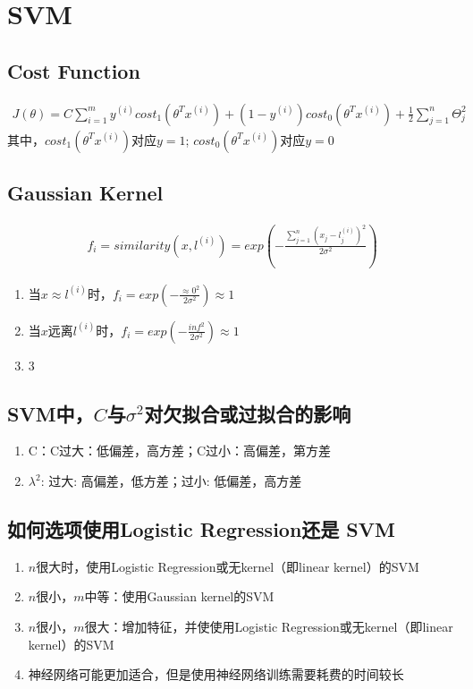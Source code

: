 \section{SVM}
\subsection{Cost Function}
\begin{equation}\begin{aligned}
	J(\theta) = C\sum_{i=1}^m y^{(i)}cost_1(\theta^Tx^{(i)}) + (1-y^{(i)})cost_0(\theta^Tx^{(i)}) + \frac{1}{2}\sum_{j=1}^n\Theta_j^2
\end{aligned}\end{equation}
其中，$cost_1(\theta^Tx^{(i)})$对应$y=1$; $cost_0(\theta^Tx^{(i)})$对应$y=0$


\subsection{Gaussian Kernel}
\begin{equation}\begin{aligned}
	f_i = similarity(x, l^{(i)}) = exp(-\frac{\sum_{j=1}^n(x_j - l_j^{(i)})^2}{2\sigma^2})
\end{aligned}\end{equation}
\begin{enumerate}
	\item 当$x \approx l^{(i)}$时，$f_i=exp(-\frac{\approx 0^2}{2\sigma^2}) \approx 1$
	\item 当$x$远离$l^{(i)}$时，$f_i=exp(-\frac{inf^2}{2\sigma^2}) \approx 1$
	\item 3
\end{enumerate}





\subsection{SVM中，$C$与$\sigma^2$对欠拟合或过拟合的影响}
\begin{enumerate}
	\item C：C过大：低偏差，高方差；C过小：高偏差，第方差
	\item $\lambda^2$: 过大: 高偏差，低方差；过小: 低偏差，高方差
\end{enumerate}



\subsection{如何选项使用Logistic Regression还是 SVM}
\begin{enumerate}
	\item $n$很大时，使用Logistic Regression或无kernel（即linear kernel）的SVM
	\item $n$很小，$m$中等：使用Gaussian kernel的SVM
	\item $n$很小，$m$很大：增加特征，并使使用Logistic Regression或无kernel（即linear kernel）的SVM
	\item 神经网络可能更加适合，但是使用神经网络训练需要耗费的时间较长
\end{enumerate}
